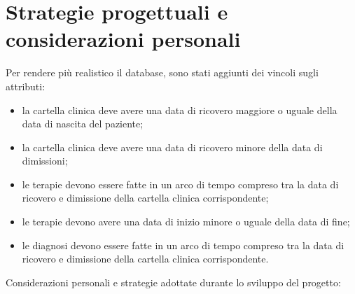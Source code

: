 \documentclass[a4paper,titlepage]{article}
\begin{document}
\part{Strategie progettuali e considerazioni personali}

Per rendere più realistico il database, sono stati aggiunti dei vincoli sugli attributi:

\begin{itemize}[leftmargin=1.5cm, topsep=0.5cm, itemsep=0.2cm]

\item la cartella clinica deve avere una data di ricovero maggiore o uguale della data di nascita del paziente;

\item la cartella clinica deve avere una data di ricovero minore della data di dimissioni;

\item le terapie devono essere fatte in un arco di tempo compreso tra la data di ricovero e dimissione della cartella clinica corrispondente;

\item le terapie devono avere una data di inizio minore o uguale della data di fine;

\item le diagnosi devono essere fatte in un arco di tempo compreso tra la data di ricovero e dimissione della cartella clinica corrispondente.

\end{itemize}

Considerazioni personali e strategie adottate durante lo sviluppo del progetto:
\end{document}
